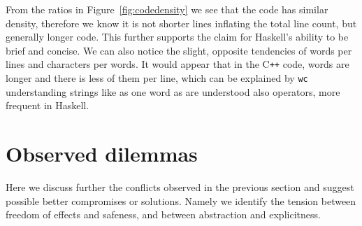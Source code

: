 \documentclass[
  digital, %
  color,   %
  table,   %
  oneside, %
  lof,     %
  lot,     %
]{fithesis3}
\newcommand{\cpp}{C\nolinebreak\texttt{+}\nolinebreak\texttt{+}}
\newcommand{\vs}{vs.\ }
\begin{document}
{From the ratios in Figure~\ref{fig:codedensity} we see that the code has similar density,
therefore we know it is not shorter lines inflating the total line count, but generally longer code.
This further supports the claim for Haskell's ability to be brief and concise.
We can also notice the slight, opposite tendencies of words per lines and characters per words.
It would appear that in the \cpp{} code, words are longer and there is less of them per line,
which can be explained by \texttt{wc} understanding strings like
 as one word as are understood also operators, more frequent in Haskell.










\section{Observed dilemmas}
\label{sect:dilemmas}

Here we discuss further the conflicts observed in the previous section
and suggest possible better compromises or solutions.
Namely we identify the tension between freedom of effects and safeness,
and between abstraction and explicitness.



}
\end{document}
